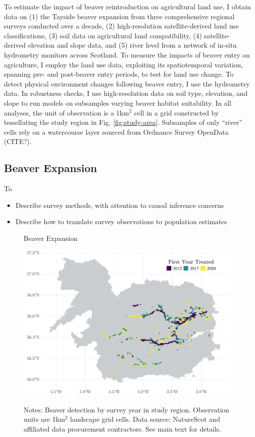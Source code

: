 To estimate the impact of beaver reintroduction on agricultural land use, I obtain data on (1) the Tayside beaver expansion from three comprehensive regional surveys conducted over a decade, (2) high-resolution satellite-derived land use classifications, (3) soil data on agricultural land compatibility, (4) satellite-derived elevation and slope data, and (5) river level from a network of in-situ hydrometry monitors across Scotland. To measure the impacts of beaver entry on agriculture, I employ the land use data, exploiting its spatiotemporal variation, spanning pre- and post-beaver entry periods, to test for land use change. To detect physical environment changes following beaver entry, I use the hydrometry data. In robustness checks, I use high-resolution data on soil type, elevation, and slope to run models on subsamples varying beaver habitat suitability. In all analyses, the unit of observation is a 1km$^2$ cell in a grid constructed by tessellating the study region in Fig. \ref{fig:study-area}. Subsamples of only ``river'' cells rely on a watercourse layer sourced from Ordnance Survey OpenData (CITE?).

\subsection{Beaver Expansion}
To 
\begin{itemize}
    \item Describe survey methods, with attention to causal inference concerns
    \item Describe how to translate survey observations to population estimates
\end{itemize}

\begin{figure}
    \centering
    \caption{Beaver Expansion}
    \includegraphics[width=0.7\linewidth]{output/figures/beaver_first_year_treated.pdf}
    \label{fig:enter-label}
    \caption*{\justifying \footnotesize Notes: Beaver detection by survey year in study region. Observation units are 1km$^2$ landscape grid cells. Data source: NatureScot and affiliated data procurement contractors. See main text for details.}
\end{figure}

